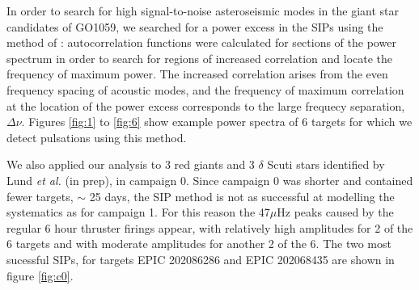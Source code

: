 \documentclass[useAMS, usenatbib, preprint, 12pt]{aastex}
\begin{document}
In order to search for high signal-to-noise asteroseismic modes in the giant
star candidates of GO1059, we searched for a power excess in the SIPs using the
method of \citet{Huber2009}: autocorrelation functions were calculated for
sections of the power spectrum in order to search for regions of increased
correlation and locate the frequency of maximum power.
The increased correlation arises from the even frequency spacing of acoustic
modes, and the frequency of maximum correlation at the location of the power
excess corresponds to the large frequecy separation, $\Delta\nu$.
Figures \ref{fig:1} to \ref{fig:6} show example power spectra of 6 targets for
which we detect pulsations using this method.

We also applied our analysis to 3 red giants and 3 $\delta$ Scuti stars
identified by Lund {\it et al.} (in prep), in campaign 0.
Since campaign 0 was shorter and contained fewer targets, $\sim$ 25 days, the
SIP method is not as successful at modelling the systematics as for campaign
1.
For this reason the 47$\mu$Hz peaks caused by the regular 6 hour thruster
firings appear, with relatively high amplitudes for 2 of the 6 targets and with
moderate amplitudes for another 2 of the 6.
The two most sucessful SIPs, for targets EPIC 202086286 and EPIC
202068435 are shown in figure \ref{fig:c0}.
\end{document}
